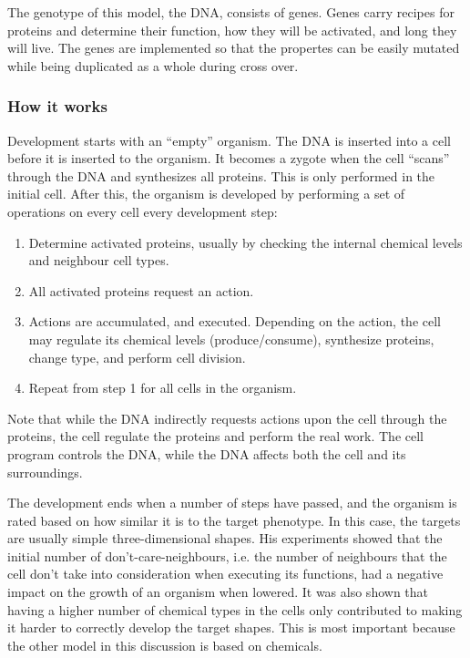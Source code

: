 The genotype of this model, the DNA, consists of genes. Genes carry recipes for proteins and determine their function, how they will be activated, and long they will live. The genes are implemented so that the propertes can be easily mutated while being duplicated as a whole during cross over.

\subsubsection{How it works}
Development starts with an ``empty'' organism. The DNA is inserted into a cell before it is inserted to the organism. It becomes a zygote when the cell ``scans'' through the DNA and synthesizes all proteins. This is only performed in the initial cell. After this, the organism is developed by performing a set of operations on every cell every development step:

\begin{enumerate}
	\itemsep=0pt
	\item Determine activated proteins, usually by checking the internal chemical levels and neighbour cell types.
	\item All activated proteins request an action.
	\item Actions are accumulated, and executed. Depending on the action, the cell may regulate its chemical levels (produce/consume), synthesize proteins, change type, and perform cell division.
	\item Repeat from step 1 for all cells in the organism.
\end{enumerate}

Note that while the DNA indirectly requests actions upon the cell through the proteins, the cell regulate the proteins and perform the real work. The cell program controls the DNA, while the DNA affects both the cell and its surroundings.

The development ends when a number of steps have passed, and the organism is rated based on how similar it is to the target phenotype. In this case, the targets are usually simple three-dimensional shapes. His experiments showed that the initial number of don't-care-neighbours, i.e. the number of neighbours that the cell don't take into consideration when executing its functions, had a negative impact on the growth of an organism when lowered. It was also shown that having a higher number of chemical types in the cells only contributed to making it harder to correctly develop the target shapes. This is most important because the other model in this discussion is based on chemicals.


